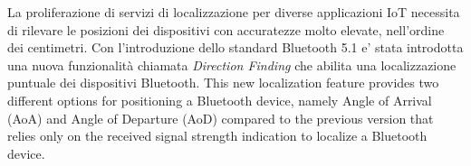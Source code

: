 La proliferazione di servizi di localizzazione per diverse applicazioni IoT necessita di rilevare le posizioni dei dispositivi con accuratezze molto
elevate, nell'ordine dei centimetri. Con l'introduzione dello standard Bluetooth 5.1 e' stata introdotta una nuova funzionalità chiamata
\textit{Direction Finding} che abilita una localizzazione puntuale dei dispositivi Bluetooth. This new localization feature provides
two different options for positioning a Bluetooth device, namely Angle of Arrival (AoA) and Angle of Departure (AoD) compared to the previous version
that relies only on the received signal strength indication to localize a Bluetooth device.
